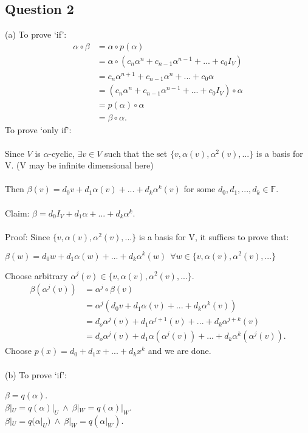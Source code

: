 \documentclass{article}
\begin{document}
\subsection*{Question 2}
(a) To prove `if':\begin{align*}
\alpha\circ\beta &= \alpha\circ p(\alpha)\\ &= \alpha\circ(c_n\alpha^n + c_{n-1}\alpha^{n-1} + ... + c_0I_V) \\ &= c_n\alpha^{n+1} + c_{n-1}\alpha^{n} + ... + c_0\alpha \\
&= (c_n\alpha^{n} + c_{n-1}\alpha^{n-1} + ... + c_0I_V)\circ\alpha\\
&= p(\alpha)\circ\alpha\\
&= \beta \circ \alpha.
\end{align*}
To prove `only if':\\\\
Since $V$ is $\alpha$-cyclic, $\exists v \in V$ such that the set $\{v,\alpha(v),\alpha^2(v),...\}$ is a basis for V. (V may be infinite dimensional here)\\\\
Then $\beta(v) = d_0v + d_1\alpha(v) + ... + d_k\alpha^k(v)$ for some $d_0, d_1,..., d_k \in \mathbb{F}.$\\\\
Claim: $\beta = d_0I_V + d_1\alpha + ... + d_k\alpha^k.$\\\\
Proof: Since $\{v,\alpha(v),\alpha^2(v),...\} $ is a basis for V, it suffices to prove that:\begin{center}
$\beta(w) = d_0w + d_1\alpha(w) + ... + d_k\alpha^k(w)\ \ \forall w \in \{v,\alpha(v),\alpha^2(v),...\} $
\end{center}
Choose arbitrary $\alpha^j(v) \in \{v,\alpha(v),\alpha^2(v),...\}$.\begin{align*}
    \beta(\alpha^j(v)) &= \alpha^j\circ\beta(v) \\
    &= \alpha^j(d_0v + d_1\alpha(v) + ... + d_k\alpha^k(v))\\
    &= d_o\alpha^j(v) + d_1\alpha^{j+1}(v) + ... + d_k\alpha^{j+k}(v)\\
    &= d_o\alpha^j(v) + d_1\alpha(\alpha^j(v)) + ... + d_k\alpha^{k}(\alpha^j(v)).
\end{align*}
Choose $p(x) = d_0 + d_1x + ... + d_kx^k$ and we are done.\\\\
(b) To prove `if':\begin{center}
    $\beta = q(\alpha)$. \\
    $\beta|_U = q(\alpha)|_U\ \land\ \beta|_W = q(\alpha)|_W$.\\
    $\beta|_U = q(\alpha|_U)\ \land\ \beta|_W = q(\alpha|_W)$.\\
\end{center}
\end{document}
